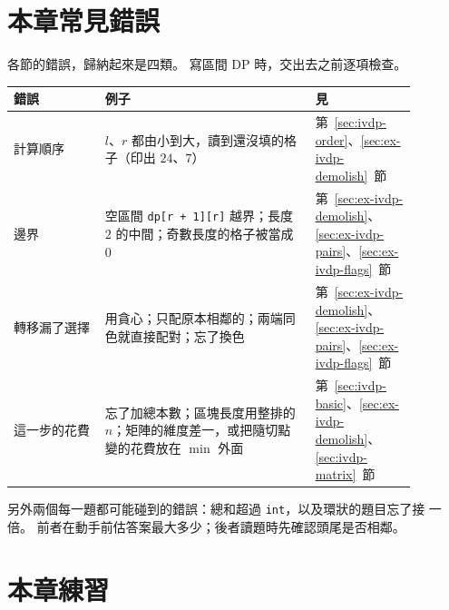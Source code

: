 \section{本章常見錯誤}
\label{sec:ivdp-pitfalls}

各節的錯誤，歸納起來是四類。 寫區間 DP 時，交出去之前逐項檢查。

\begin{center}
\begin{tabular}{p{0.2\linewidth}p{0.46\linewidth}p{0.22\linewidth}}
\toprule
錯誤 & 例子 & 見 \\
\midrule
計算順序 & $l$、$r$ 都由小到大，讀到還沒填的格子（印出 $24$、$7$） &
第~\ref{sec:ivdp-order}、\ref{sec:ex-ivdp-demolish}~節 \\
邊界 & 空區間 \texttt{dp[r + 1][r]} 越界；長度 $2$ 的中間；奇數長度的格子被當成
$0$ & 第~\ref{sec:ex-ivdp-demolish}、\ref{sec:ex-ivdp-pairs}、\ref{sec:ex-ivdp-flags}~節 \\
轉移漏了選擇 & 用貪心；只配原本相鄰的；兩端同色就直接配對；忘了換色 &
第~\ref{sec:ex-ivdp-demolish}、\ref{sec:ex-ivdp-pairs}、\ref{sec:ex-ivdp-flags}~節 \\
這一步的花費 & 忘了加總本數；區塊長度用整排的 $n$；矩陣的維度差一，或把隨切點變的花費放在 $\min$ 外面 & 第~\ref{sec:ivdp-basic}、\ref{sec:ex-ivdp-demolish}、\ref{sec:ivdp-matrix}~節 \\
\bottomrule
\end{tabular}
\end{center}

另外兩個每一題都可能碰到的錯誤：總和超過 \texttt{int}，以及環狀的題目忘了接
一倍。 前者在動手前估答案最大多少；後者讀題時先確認頭尾是否相鄰。

\section{本章練習}
\label{sec:ivdp-exercises}

